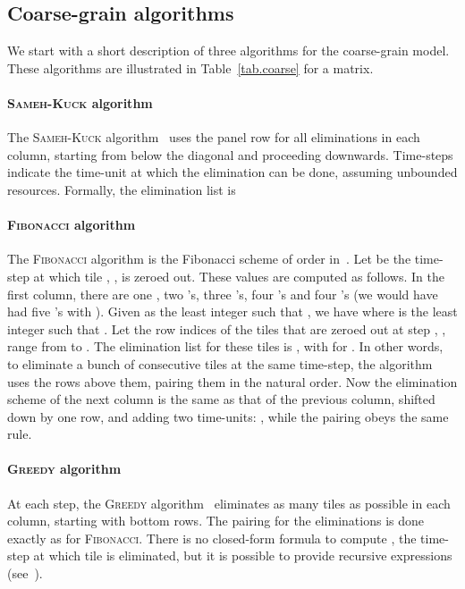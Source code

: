\documentclass[a4paper,twopages]{article}
\newcommand{\SK}{\textsc{Sameh-Kuck}\xspace}
\newcommand{\MC}{\textsc{Fibonacci}\xspace}
\newcommand{\Greedy}{\textsc{Greedy}\xspace}
\begin{document}
\subsection{Coarse-grain algorithms}\label{sec:Coarsegrain}

We start with a short description of three algorithms for the coarse-grain model.
These algorithms are illustrated in Table~\ref{tab.coarse} for a  matrix.

\paragraph{\SK algorithm}
The \SK algorithm~\cite{SamehKuck78} uses the panel row for all eliminations in
each column, starting from below the diagonal and proceeding downwards.
Time-steps indicate the time-unit at which the elimination can be done,
assuming unbounded resources. Formally, the elimination list is


\paragraph{\MC algorithm}
The \MC algorithm is the Fibonacci scheme of order  in~\cite{ModiClarke84}.
Let  be the time-step at which tile , , is zeroed
out.  These values are computed as follows. In the first column, there are one
, two 's, three 's, four 's and four 's (we would have had five
's with ).  Given  as the least integer such that , we have  where  is the least integer such that .  Let the row indices of the  tiles that are zeroed out at
step , , range from  to . The elimination list
for these tiles is , with  for . In other words, to eliminate a bunch of  consecutive tiles
at the same time-step, the algorithm uses the  rows above them, pairing them
in the natural order.  Now the elimination scheme of the next column is the
same as that of the previous column, shifted down by one row, and adding two
time-units: , while the pairing obeys the
same rule.


\paragraph{\Greedy algorithm}
At each step, the \Greedy algorithm~\cite{j14,j12} eliminates as many tiles as
possible in each column, starting with bottom rows. The pairing for the
eliminations is done exactly as for \MC.  There is no closed-form formula to
compute , the time-step at which tile  is eliminated, but
it is possible to provide recursive expressions (see~\cite{j14,j12}).
\end{document}

